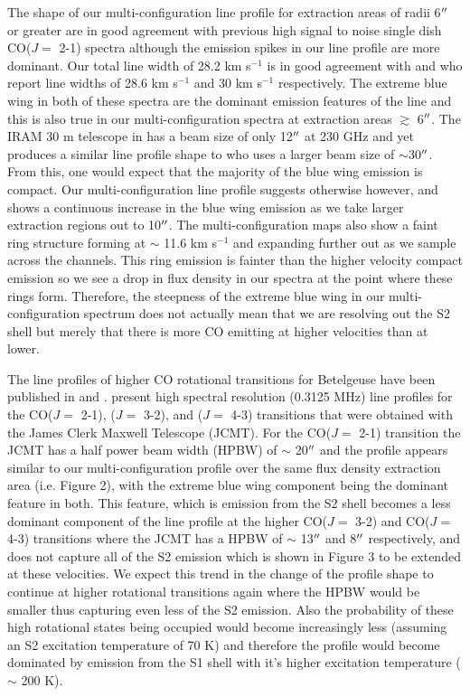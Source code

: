 \documentclass[apj]{emulateapj}
\begin{document}
The shape of our multi-configuration line profile for extraction areas of radii 6$\mbox{$^{\prime\prime}$}$ or greater are in good agreement with previous high signal to noise single dish CO($J=$ 2-1) spectra \cite[e.g.][Fig. 1.]{1994ApJ...424L.127H} although the emission spikes in our line profile are more dominant. Our total line width of 28.2 km s${}^{-1}$ is in good agreement with \cite{1987ApJ...313..400H} and \cite{1994ApJ...424L.127H} who report line widths of 28.6 km s${}^{-1}$ and 30 km s${}^{-1}$ respectively. The extreme blue wing in both of these spectra are the dominant emission features of the line and this is also true in our multi-configuration spectra at extraction areas $\gtrsim$ 6$\mbox{$^{\prime\prime}$}$. The IRAM 30 m telescope in \cite{1994ApJ...424L.127H} has a beam size of only 12$\mbox{$^{\prime\prime}$}$ at 230 GHz and yet produces a similar line profile shape to \cite{1987ApJ...313..400H} who uses a larger beam size of $\sim$30$\mbox{$^{\prime\prime}$}$. From this, one would expect that the majority of the blue wing emission is compact. Our multi-configuration line profile suggests otherwise however, and shows a continuous increase in the blue wing emission as we take larger extraction regions out to 10$\mbox{$^{\prime\prime}$}$. The multi-configuration maps also show a faint ring structure forming at $\sim$ 11.6 km s${}^{-1}$ and expanding further out as we sample across the channels. This ring emission is fainter than the higher velocity compact emission so we see a drop in flux density in our spectra at the point where these rings form. Therefore, the steepness of the extreme blue wing in our multi-configuration spectrum does not actually mean that we are resolving out the S2 shell but merely that there is more CO emitting at higher velocities than at lower.

The line profiles of higher CO rotational transitions for Betelgeuse have been published in \cite{2003A&A...407..609K} and \cite{2010A&A...523A..18D}. \cite{2010A&A...523A..18D} present high spectral resolution (0.3125 MHz) line profiles for the CO($J=$ 2-1), ($J=$ 3-2), and ($J=$ 4-3) transitions that were obtained with the James Clerk Maxwell Telescope (JCMT). For the CO($J=$ 2-1) transition the JCMT has a half power beam width (HPBW) of $\sim$ 20$\mbox{$^{\prime\prime}$}$ and the profile appears similar to our multi-configuration profile over the same flux density extraction area (i.e. Figure 2), with the extreme blue wing component being the dominant feature in both. This feature, which is emission from the S2 shell becomes a less dominant component of the line profile at the higher CO($J=$ 3-2) and CO($J=$ 4-3) transitions where the JCMT has a HPBW of $\sim$ 13$\mbox{$^{\prime\prime}$}$ and 8$\mbox{$^{\prime\prime}$}$ respectively, and does not capture all of the S2 emission which is shown in Figure 3 to be extended at these velocities. We expect this trend in the change of the profile shape to continue at higher rotational transitions again where the HPBW would be smaller thus capturing even less of the S2 emission. Also the probability of these high rotational states being occupied would become increasingly less (assuming an S2 excitation temperature of 70 K) and therefore the profile would become dominated by emission from the S1 shell with it's higher excitation temperature ($\sim$ 200 K).
\end{document}
